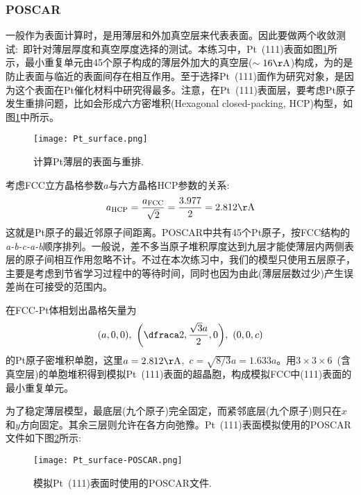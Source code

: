 \subsubsection{\rm{POSCAR}}
一般作为表面计算时，是用薄层和外加真空层来代表表面。因此要做两个收敛测试:~即针对薄层厚度和真空厚度选择的测试。本练习中，\textrm{Pt~(111)}表面如图\ref{Pt_surface}所示，最小重复单元由45个原子构成的薄层外加大的真空层($\sim16\mathrm{\AA}$)构成，为的是防止表面与临近的表面间存在相互作用。至于选择\textrm{Pt~(111)}面作为研究对象，是因为这个表面在\textrm{Pt}催化材料中研究得最多。注意，在\textrm{Pt~(111)}表面层，要考虑\textrm{Pt}原子发生重排问题，比如会形成六方密堆积\textrm{(Hexagonal closed-packing, HCP)}构型，如图\ref{Pt_surface}中所示。
\begin{figure}[h!]
\centering
\texttt{[image: Pt\_surface.png]}
\caption{\small \textrm{计算\textrm{Pt}薄层的表面与重排.}}%
\label{Pt_surface}
\end{figure}

考虑\textrm{FCC}立方晶格参数$a$与六方晶格\textrm{HCP}参数的关系:~
\begin{displaymath}
	a_{\mathrm{HCP}}=\dfrac{a_{\mathrm{FCC}}}{\sqrt2}=\dfrac{3.977}2=2.812\mathrm{\AA}
\end{displaymath}
这就是\textrm{Pt}原子的最近邻原子间距离。\textrm{POSCAR}中共有45个\textrm{Pt}原子，按\textrm{FCC}结构的\textit{a-b-c-a-b}顺序排列。一般说，差不多当原子堆积厚度达到九层才能使薄层内两侧表层的原子间相互作用忽略不计。不过在本次练习中，我们的模型只使用五层原子，主要是考虑到节省学习过程中的等待时间，同时也因为由此(薄层层数过少)产生误差尚在可接受的范围内。

在\textrm{FCC-Pt}体相划出晶格矢量为
\begin{displaymath}
	(a,0,0),~\bigg(\dfraca2,\dfrac{\sqrt3a}2,0\bigg),~(0,0,c)
\end{displaymath}
的\textrm{Pt}原子密堆积单胞，这里$a=2.812\mathrm{\AA}$,~$c=\sqrt{8/3}a=1.633a$。用$3\times3\times6$~(含真空层)的单胞堆积得到模拟\textrm{Pt~(111)}表面的超晶胞，构成模拟\textrm{FCC}中\textrm{(111)}表面的最小重复单元。

为了稳定薄层模型，最底层(九个原子)完全固定，而紧邻底层(九个原子)则只在$x$和$y$方向固定。其余三层则允许在各方向弛豫。\textrm{Pt~(111)}表面模拟使用的\textrm{POSCAR}文件如下图\ref{Pt_surface-POSCAR}所示:
\begin{figure}[h!]
\centering
\texttt{[image: Pt\_surface-POSCAR.png]}
\caption{\small \textrm{模拟\textrm{Pt~(111)}表面时使用的\textrm{POSCAR}文件.}}%
\label{Pt_surface-POSCAR}
\end{figure}

